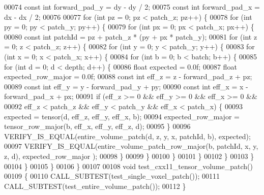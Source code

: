 \begin{DoxyCode}
00074   \textcolor{keyword}{const} \textcolor{keywordtype}{int} forward\_pad\_y = dy - dy / 2;
00075   \textcolor{keyword}{const} \textcolor{keywordtype}{int} forward\_pad\_x = dx - dx / 2;
00076 
00077   \textcolor{keywordflow}{for} (\textcolor{keywordtype}{int} pz = 0; pz < patch\_z; pz++) \{
00078     \textcolor{keywordflow}{for} (\textcolor{keywordtype}{int} py = 0; py < patch\_y; py++) \{
00079       \textcolor{keywordflow}{for} (\textcolor{keywordtype}{int} px = 0; px < patch\_x; px++) \{
00080         \textcolor{keyword}{const} \textcolor{keywordtype}{int} patchId = pz + patch\_z * (py + px * patch\_y);
00081         \textcolor{keywordflow}{for} (\textcolor{keywordtype}{int} z = 0; z < patch\_z; z++) \{
00082           \textcolor{keywordflow}{for} (\textcolor{keywordtype}{int} y = 0; y < patch\_y; y++) \{
00083             \textcolor{keywordflow}{for} (\textcolor{keywordtype}{int} x = 0; x < patch\_x; x++) \{
00084               \textcolor{keywordflow}{for} (\textcolor{keywordtype}{int} b = 0; b < batch; b++) \{
00085                 \textcolor{keywordflow}{for} (\textcolor{keywordtype}{int} d = 0; d < depth; d++) \{
00086                   \textcolor{keywordtype}{float} expected = 0.0f;
00087                   \textcolor{keywordtype}{float} expected\_row\_major = 0.0f;
00088                   \textcolor{keyword}{const} \textcolor{keywordtype}{int} eff\_z = z - forward\_pad\_z + pz;
00089                   \textcolor{keyword}{const} \textcolor{keywordtype}{int} eff\_y = y - forward\_pad\_y + py;
00090                   \textcolor{keyword}{const} \textcolor{keywordtype}{int} eff\_x = x - forward\_pad\_x + px;
00091                   \textcolor{keywordflow}{if} (eff\_z >= 0 && eff\_y >= 0 && eff\_x >= 0 &&
00092                       eff\_z < patch\_z && eff\_y < patch\_y && eff\_x < patch\_x) \{
00093                     expected = tensor(d, eff\_z, eff\_y, eff\_x, b);
00094                     expected\_row\_major = tensor\_row\_major(b, eff\_x, eff\_y, eff\_z, d);
00095                   \}
00096                   VERIFY\_IS\_EQUAL(entire\_volume\_patch(d, z, y, x, patchId, b), expected);
00097                   VERIFY\_IS\_EQUAL(entire\_volume\_patch\_row\_major(b, patchId, x, y, z, d), expected\_row\_major
      );
00098                 \}
00099               \}
00100             \}
00101           \}
00102         \}
00103       \}
00104     \}
00105   \}
00106 \}
00107 
00108 \textcolor{keywordtype}{void} test\_cxx11\_tensor\_volume\_patch()
00109 \{
00110   CALL\_SUBTEST(test\_single\_voxel\_patch());
00111   CALL\_SUBTEST(test\_entire\_volume\_patch());
00112 \}
\end{DoxyCode}
